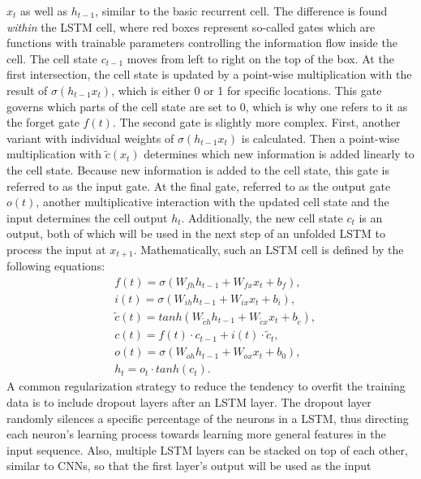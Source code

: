 \documentclass[a4paper,11pt]{article}
\begin{document}
\(x_t\) as well as \(h_{t-1}\), similar to the basic recurrent cell. The difference is
found \emph{within} the LSTM cell, where red boxes represent so-called gates which are functions
with trainable parameters controlling the information flow inside the cell.
The cell state \(c_{t-1}\) moves from left to right on the top of the box.
At the first intersection, the cell state is updated by a point-wise multiplication
with the result of \(\sigma(h_{t-1}x_t)\), which is either 0 or 1 for specific locations.
This gate governs which parts of the cell state are set to 0, which is why one refers
to it as the forget gate \(f(t)\).
The second gate is slightly more complex. First, another variant with individual weights
of \(\sigma(h_{t-1}x_t)\) is calculated. Then a point-wise multiplication with
\(\widetilde{c}(x_t)\) determines which new information is added linearly
to the cell state. Because new information is added to the cell state, this gate
is referred to as the input gate.
At the final gate, referred to as the output gate \(o(t)\), another multiplicative
interaction with the updated cell state and the input determines the cell
output \(h_t\). Additionally, the new cell state \(c_t\) is an output, both of which
will be used in the next step of an unfolded LSTM to process the input at \(x_{t+1}\).
Mathematically, such an LSTM cell is defined by the following equations:
\begin{equation}
\begin{aligned}
& f(t) = \sigma (W_{fh} h_{t-1} + W_{fx}x_t + b_f), \\
& i(t) = \sigma (W_{ih} h_{t-1} + W_{ix}x_t + b_i), \\
& \widetilde{c}(t) = tanh(W_{\widetilde{c}h} h_{t-1} + W_{\widetilde{c}x}x_t + b_{\widetilde{c}}), \\
& c(t) = f(t) \cdot c_{t-1} + i(t) \cdot \widetilde{c}_t, \\
& o(t) = \sigma (W_{oh} h_{t-1} + W_{ox}x_t + b_0), \\
& h_t = o_t \cdot tanh(c_t).
\end{aligned}
\label{eq:lstm-cell}
\end{equation}
A common regularization strategy to reduce the tendency to overfit the training
data is to include dropout layers after an LSTM layer. The dropout layer randomly
silences a specific percentage of the neurons in a LSTM, thus directing each
neuron's learning process towards learning more general features in the
input sequence. Also, multiple LSTM layers can be stacked on top of each other,
similar to CNNs, so that the first layer's output will be used as the input
\end{document}
